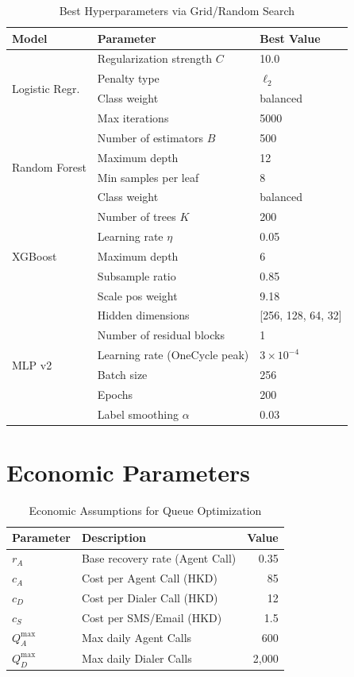 \documentclass[11pt, a4paper]{article}
\begin{document}
\begin{table}[H]
\centering
\caption{Best Hyperparameters via Grid/Random Search}
\label{tab:hparams}
\small
\renewcommand{\arraystretch}{1.15}
\begin{tabular}{@{}lll@{}}
\toprule
\textbf{Model} & \textbf{Parameter} & \textbf{Best Value}\\
\midrule
\multirow{4}{*}{Logistic Regr.}
& Regularization strength $C$ & 10.0\\
& Penalty type & $\ell_2$\\
& Class weight & balanced\\
& Max iterations & 5000\\
\midrule
\multirow{4}{*}{Random Forest}
& Number of estimators $B$ & 500\\
& Maximum depth & 12\\
& Min samples per leaf & 8\\
& Class weight & balanced\\
\midrule
\multirow{5}{*}{XGBoost}
& Number of trees $K$ & 200\\
& Learning rate $\eta$ & 0.05\\
& Maximum depth & 6\\
& Subsample ratio & 0.85\\
& Scale pos weight & 9.18\\
\midrule
\multirow{6}{*}{MLP v2}
& Hidden dimensions & [256, 128, 64, 32]\\
& Number of residual blocks & 1\\
& Learning rate (OneCycle peak) & $3 \times 10^{-4}$\\
& Batch size & 256\\
& Epochs & 200\\
& Label smoothing $\alpha$ & 0.03\\
\bottomrule
\end{tabular}
\end{table}

\section{Economic Parameters}\label{app:econ_params}

\begin{table}[H]
\centering
\caption{Economic Assumptions for Queue Optimization}
\label{tab:econ_params}
\small
\begin{tabular}{@{}llr@{}}
\toprule
\textbf{Parameter} & \textbf{Description} & \textbf{Value}\\
\midrule
$r_A$ & Base recovery rate (Agent Call) & 0.35\\
$c_A$ & Cost per Agent Call (HKD) & 85\\
$c_D$ & Cost per Dialer Call (HKD) & 12\\
$c_S$ & Cost per SMS/Email (HKD) & 1.5\\
$Q_A^{\max}$ & Max daily Agent Calls & 600\\
$Q_D^{\max}$ & Max daily Dialer Calls & 2{,}000\\
\bottomrule
\end{tabular}
\end{table}
\end{document}
